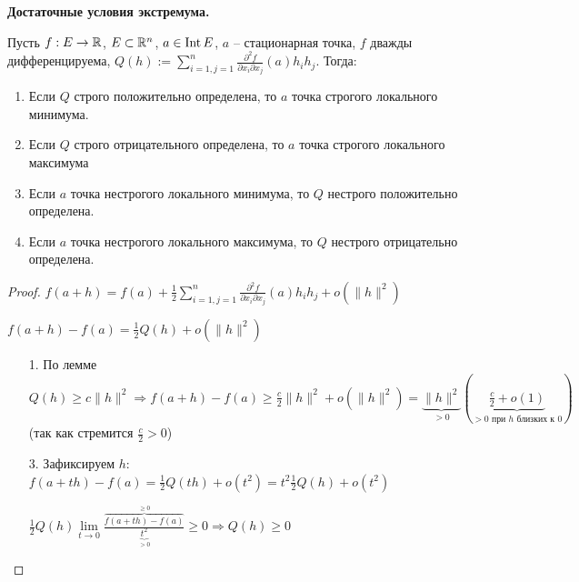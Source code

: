 \begin{theorem}
    \textbf{Достаточные условия экстремума.}

    Пусть $f: E\rightarrow \mathbb{R}$, $E\subset \mathbb{R}^n$, $a\in \operatorname{Int} E$, $a$ – стационарная точка, $f$ дважды дифференцируема, $Q(h):=\sum\limits_{i=1, j=1}^n\frac{\partial^2 f}{\partial x_i \partial x_j}(a) h_i h_j$. Тогда:
    \begin{enumerate}
        \item Если $Q$ строго положительно определена, то $a$ точка строгого локального минимума.
        \item Если $Q$ строго отрицательного определена, то $a$ точка строгого локального максимума
        \item Если $a$ точка нестрогого локального минимума, то $Q$ нестрого положительно определена.
        \item Если $a$ точка нестрогого локального максимума, то $Q$ нестрого отрицательно определена.
    \end{enumerate}
\end{theorem}
\begin{proof}
    $f(a+h)=f(a)+\frac{1}{2}\sum\limits_{i=1, j=1}^n\frac{\partial^2 f}{\partial x_i \partial x_j}(a) h_i h_j+o(\|h\|^2)$

    $f(a+h)-f(a)=\frac{1}{2}Q(h)+o(\|h\|^2)$
    \begin{enumerate}
        \item[1.] По лемме $Q(h)\geq c\|h\|^2\Rightarrow f(a+h)-f(a)\geq \frac{c}{2}\|h\|^2 + o(\|h\|^2)=\underbrace{\|h\|^2}_{>0}(\underbrace{\frac{c}{2}+o(1)}_{>0\text{ при $h$ близких к 0}})$ (так как стремится $\frac{c}{2}>0$)
        \item[3.] Зафиксируем $h$: $f(a+th)-f(a)=\frac{1}{2}Q(th)+o(t^2)=t^2\frac{1}{2}Q(h)+o(t^2)$

        $\frac{1}{2}Q(h)\lim\limits_{t\rightarrow 0}\frac{\overbrace{f(a+th)-f(a)}^{\geq 0}}{\underbrace{t^2}_{> 0}}\geq 0 \Rightarrow Q(h)\geq 0 $
    \end{enumerate}
\end{proof}

